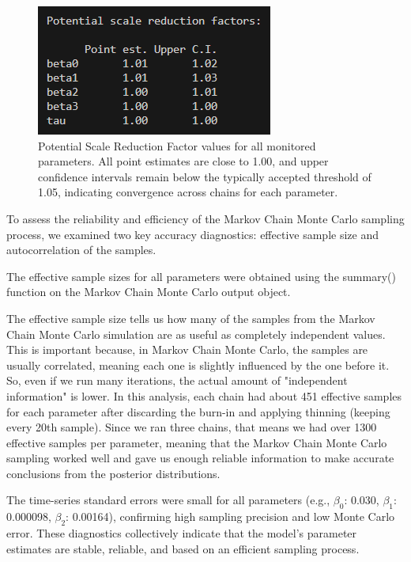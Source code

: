 \documentclass[]{article}
\begin{document}
\begin{figure}[H]
	\centering
	\includegraphics[width=0.7\linewidth]{img/img-psrf}
	\caption{Potential Scale Reduction Factor values for all monitored parameters. All point estimates are close to 1.00, and upper confidence intervals remain below the typically accepted threshold of 1.05, indicating convergence across chains for each parameter.}
	\label{fig:img-psrf}
\end{figure}


To assess the reliability and efficiency of the Markov Chain Monte Carlo sampling process, we examined two key accuracy diagnostics: effective sample size  and autocorrelation of the samples.

The effective sample sizes for all parameters were obtained using the summary() function on the Markov Chain Monte Carlo output object.

The effective sample size tells us how many of the samples from the Markov Chain Monte Carlo simulation are as useful as completely independent values. This is important because, in Markov Chain Monte Carlo, the samples are usually correlated, meaning each one is slightly influenced by the one before it. So, even if we run many iterations, the actual amount of "independent information" is lower.
In this analysis, each chain had about 451 effective samples for each parameter after discarding the burn-in and applying thinning (keeping every 20th sample). Since we ran three chains, that means we had over 1300 effective samples per parameter, meaning that the Markov Chain Monte Carlo sampling worked well and gave us enough reliable information to make accurate conclusions from the posterior distributions.

The time-series standard errors were small for all parameters (e.g., $\beta_0$: 0.030, $\beta_1$: 0.000098, $\beta_2$: 0.00164), confirming high sampling precision and low Monte Carlo error. These diagnostics collectively indicate that the model's parameter estimates are stable, reliable, and based on an efficient sampling process.
\end{document}
